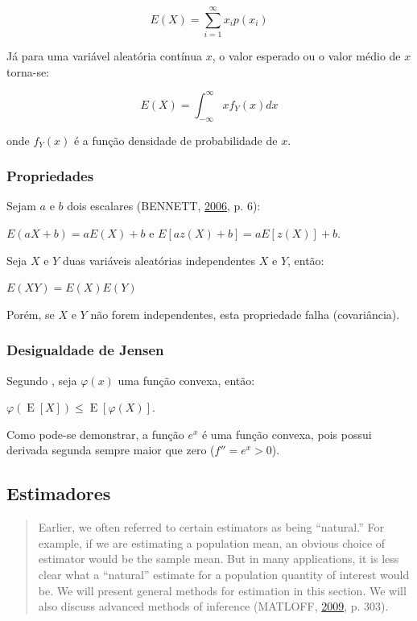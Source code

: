 \documentclass[a4paper]{article}
\begin{document}
\[E(X) = \sum_{i = 1}^{\infty}x_ip(x_i)\]

Já para uma variável aleatória contínua \(x\), o valor esperado ou o
valor médio de \(x\) torna-se:

\[E(X) = \int_{-\infty}^{\infty}xf_Y(x)dx\]

onde \(f_Y(x)\) é a função densidade de probabilidade de \(x\).

\subsubsection{Propriedades}\label{propriedades}

Sejam \(a\) e \(b\) dois escalares (BENNETT,
\protect\hyperlink{ref-bennett}{2006}, p. 6):

\(E(aX + b) = aE(X) + b\) e \(E[az(X) + b] = aE[z(X)] + b.\)

Seja \(X\) e \(Y\) duas variáveis aleatórias independentes \(X\) e
\(Y\), então:

\(E(XY) = E(X)E(Y)\)

Porém, se \(X\) e \(Y\) não forem independentes, esta propriedade falha
(covariância).

\subsubsection{Desigualdade de Jensen}\label{desigualdade-de-jensen}

Segundo , seja \(\varphi(x)\) uma função convexa, então:

\(\varphi \left(\operatorname {E} [X]\right)\leq \operatorname {E} \left[\varphi (X)\right].\)

Como pode-se demonstrar, a função \(e^x\) é uma função convexa, pois
possui derivada segunda sempre maior que zero (\({f}''=e^x>0\)).

\subsection{Estimadores}\label{estimadores}

\begin{quote}
Earlier, we often referred to certain estimators as being ``natural.''
For example, if we are estimating a population mean, an obvious choice
of estimator would be the sample mean. But in many applications, it is
less clear what a ``natural'' estimate for a population quantity of
interest would be. We will present general methods for estimation in
this section. We will also discuss advanced methods of inference
(MATLOFF, \protect\hyperlink{ref-matloff2009}{2009}, p. 303).
\end{quote}
\end{document}
